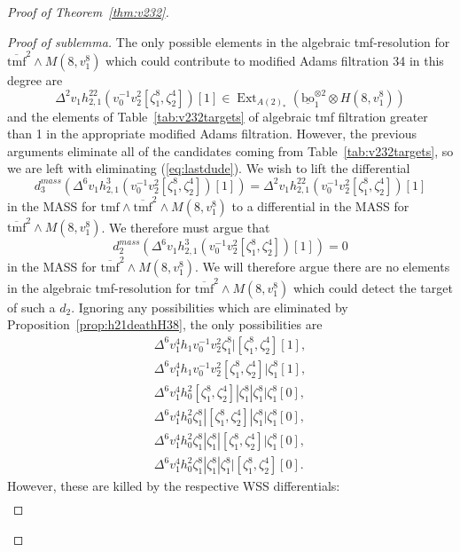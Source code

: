 \documentclass[10pt]{amsart}
\newcommand{\ul}[1]{\underline{#1}}
\newcommand{\br}[1]{\overline{#1}}
\newcommand{\tmf}{\mathrm{tmf}}
\newcommand{\bo}{\mathrm{bo}}
\newcommand{\bou}{\ul{\bo}}
\theoremstyle{definition}
\numberwithin{equation}{section}
\numberwithin{figure}{section}
\DeclareMathOperator{\Ext}{Ext}
\begin{document}
\begin{proof}[Proof of Theorem~\ref{thm:v232}]
\begin{description}
\begin{proof}[Proof of sublemma]
The only possible elements in the algebraic tmf-resolution for $\br{\tmf}^{2} \wedge M(8,v_1^8)$ which could contribute to modified Adams filtration 34 in this degree are
\begin{equation}\label{eq:lastdude}
\Delta^2 v_1 h_{2,1}^{22}(v_0^{-1}v_2^2[\zeta_1^8,\zeta_2^4])[1] \in \Ext_{A(2)_*}(\bou_1^{\otimes 2} \otimes H(8,v_1^8))
\end{equation}
and the elements of Table~\ref{tab:v232targets} of algebraic tmf filtration greater than 1 in the appropriate modified Adams filtration.  However, the previous arguments eliminate all of the candidates coming from Table~\ref{tab:v232targets}, so we are left with eliminating (\ref{eq:lastdude}).   We wish to lift the differential
$$ d_3^{mass}(\Delta^6 v_1 h_{2,1}^{3}(v_0^{-1}v_2^2[\zeta_1^8,\zeta_2^4])[1])
= \Delta^2 v_1 h_{2,1}^{22}(v_0^{-1}v_2^2[\zeta_1^8,\zeta_2^4])[1] $$
in the MASS for $\tmf \wedge \br{\tmf}^2 \wedge M(8,v_1^8)$ to a differential in the MASS for $\br{\tmf}^2 \wedge M(8,v_1^8)$.  We therefore must argue that 
$$ d_2^{mass}(\Delta^6 v_1 h_{2,1}^{3}(v_0^{-1}v_2^2[\zeta_1^8,\zeta_2^4])[1]) = 0 $$
in the MASS for $\br{\tmf}^2 \wedge M(8,v_1^8)$.   
We will therefore argue there are no elements in the algebraic tmf-resolution for $\br{\tmf}^2 \wedge M(8,v_1^8)$ which could detect the target of such a $d_2$.
Ignoring any possibilities which are eliminated by Proposition~\ref{prop:h21deathH38}, the only possibilities are
\begin{equation*}
\begin{split}
\Delta^6 v_1^4 h_1 v_0^{-1}v_2^2\zeta_1^8|[\zeta_1^8,\zeta_2^4][1], \\
\Delta^6 v_1^4 h_1 v_0^{-1}v_2^2[\zeta_1^8,\zeta_2^4]|\zeta_1^8[1], \\
\Delta^6 v_1^4 h_0^2 [\zeta_1^8,\zeta_2^4]|\zeta_1^8|\zeta_1^8|\zeta_1^8[0], \\
\Delta^6 v_1^4 h_0^2 \zeta_1^8|[\zeta_1^8,\zeta_2^4]|\zeta_1^8|\zeta_1^8[0], \\
\Delta^6 v_1^4 h_0^2 \zeta_1^8|\zeta_1^8|[\zeta_1^8,\zeta_2^4]|\zeta_1^8[0], \\
\Delta^6 v_1^4 h_0^2 \zeta_1^8|\zeta_1^8|\zeta_1^8|[\zeta_1^8,\zeta_2^4][0].
\end{split}
\end{equation*}
However, these are killed by the respective WSS differentials:
\begin{equation*}
\begin{split}

\end{split}
\end{equation*}
\end{proof}
\end{description}
\end{proof}
\end{document}
